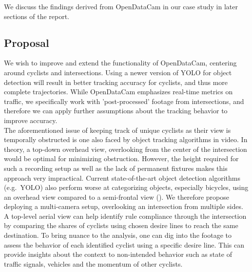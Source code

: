We discuss the findings derived from OpenDataCam in our case study in later sections of the report.

\subsection{Proposal}
We wish to improve and extend the functionality of OpenDataCam, centering around cyclists and intersections.
Using a newer version of YOLO for object detection will result in better tracking accuracy for cyclists, 
and thus more complete trajectories.
While OpenDataCam emphasizes real-time metrics on traffic, we specifically work with 'post-processed' footage 
from intersections, and therefore we can apply further assumptions about the tracking behavior to improve accuracy.
\ \\

The aforementioned issue of keeping track of unique cyclists as their view is temporally obstructed is one also faced by 
object tracking algorithms in video. In theory, a top-down overhead view, overlooking from the center of the 
intersection would be optimal for minimizing obstruction.
However, the height required for such a recording setup as well as the lack of permanent fixtures makes this 
approach very impractical. 
Current state-of-the-art object detection algorithms (e.g.~YOLO) also perform worse at categorizing objects, 
especially bicycles, using an overhead view compared to a semi-frontal view (\cite{overhead}). 
We therefore propose deploying a multi-camera setup, overlooking an intersection from multiple sides.
\ \\

A top-level aerial view can help identify rule compliance through the intersection by comparing
the shares of cyclists using chosen desire lines to reach the same destination. 
To bring nuance to the analysis, one can dig into the footage to assess the behavior of 
each identified cyclist using a specific desire line. 
This can provide insights about the context to non-intended behavior such as state of traffic signals, 
vehicles and the momentum of other cyclists.